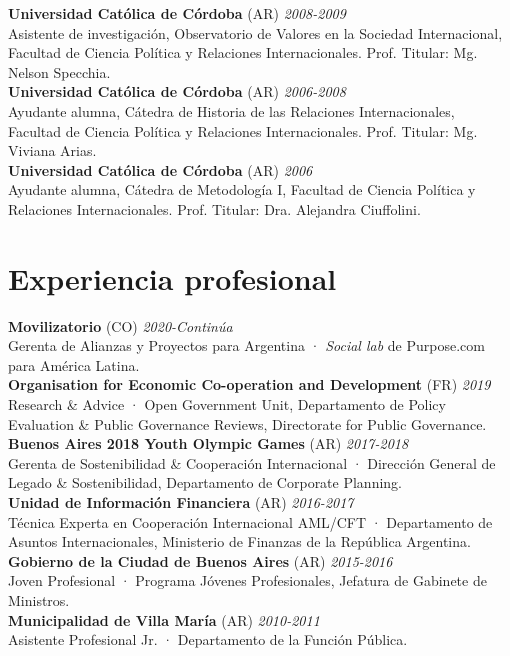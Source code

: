 \documentclass[12pt]{article}
\begin{document}
\begin{rSection}
{\bf Universidad Católica de Córdoba} (AR) \hfill {\em 2008-2009} \\ 
Asistente de investigación, Observatorio de Valores en la Sociedad Internacional, Facultad de Ciencia Política y Relaciones Internacionales. Prof. Titular: Mg. Nelson Specchia.\\

{\bf Universidad Católica de Córdoba} (AR) \hfill {\em 2006-2008} \\ 
Ayudante alumna, Cátedra de Historia de las Relaciones Internacionales, Facultad de Ciencia Política y Relaciones Internacionales. Prof. Titular: Mg. Viviana Arias.\\

{\bf Universidad Católica de Córdoba} (AR) \hfill {\em 2006} \\ 
Ayudante alumna, Cátedra de Metodología I, Facultad de Ciencia Política y Relaciones Internacionales. Prof. Titular: Dra. Alejandra Ciuffolini.

\end{rSection}

\section*{Experiencia profesional}

\begin{rSection}

{\bf Movilizatorio} (CO) \hfill {\em 2020-Continúa} \\ 
Gerenta de Alianzas y Proyectos para Argentina · {\em Social lab} de Purpose.com para América Latina.\\

{\bf Organisation for Economic Co-operation and Development} (FR) \hfill {\em 2019} \\ 
Research \& Advice · Open Government Unit, Departamento de Policy Evaluation \& Public Governance Reviews, Directorate for Public Governance.\\

{\bf Buenos Aires 2018 Youth Olympic Games} (AR) \hfill {\em 2017-2018} \\ 
Gerenta de Sostenibilidad \& Cooperación Internacional · Dirección General de Legado \& Sostenibilidad, Departamento de Corporate Planning.\\

{\bf Unidad de Información Financiera} (AR) \hfill {\em 2016-2017} \\ 
Técnica Experta en Cooperación Internacional AML/CFT · Departamento de Asuntos Internacionales, Ministerio de Finanzas de la República Argentina.\\

{\bf Gobierno de la Ciudad de Buenos Aires} (AR) \hfill {\em 2015-2016} \\ 
Joven Profesional · Programa Jóvenes Profesionales, Jefatura de Gabinete de Ministros.\\

{\bf Municipalidad de Villa María} (AR) \hfill {\em 2010-2011} \\ 
Asistente Profesional Jr. · Departamento de la Función Pública.

\end{rSection}
\end{document}
